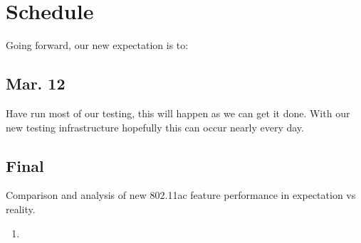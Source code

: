 \section{Schedule}


Going forward, our new expectation is to:

\subsection{Mar. 12}
Have run most of our testing, this will happen as we can get it
done. With our new testing infrastructure hopefully this can occur
nearly every day.

\subsection{Final}
Comparison and analysis of new 802.11ac feature performance in expectation vs reality.
\begin{enumerate}
\item {}
\end{enumerate}
